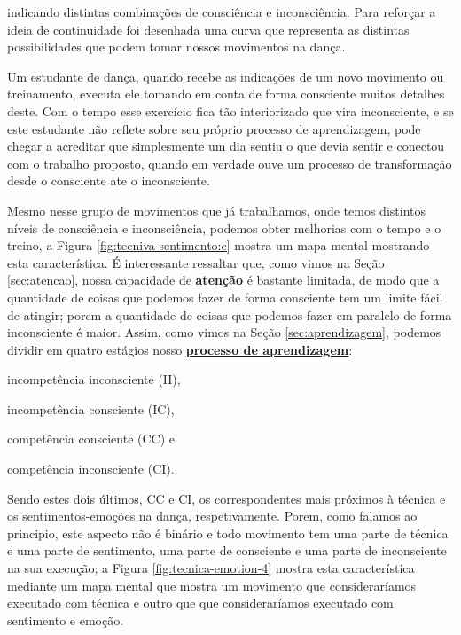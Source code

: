 indicando distintas combinações de consciência e inconsciência.
Para reforçar a ideia de continuidade foi desenhada uma curva que representa as 
distintas possibilidades que podem tomar nossos movimentos na dança.
\begin{example} Um estudante de dança, quando recebe
as indicações de um novo movimento ou treinamento, 
executa ele tomando em conta de forma consciente muitos detalhes deste.
Com o tempo esse exercício fica tão interiorizado que vira inconsciente,
e se este estudante não reflete sobre seu próprio processo de aprendizagem, pode chegar a acreditar 
que simplesmente um dia sentiu o que devia sentir e conectou com o trabalho proposto,
quando em verdade ouve um processo de transformação desde o consciente ate o inconsciente.
\end{example}
Mesmo nesse grupo de movimentos que já trabalhamos, 
onde temos distintos níveis de consciência  e inconsciência,
podemos obter melhorias com o tempo e o treino, a Figura \ref{fig:tecniva-sentimento:c} 
mostra um mapa mental mostrando esta característica.
É interessante ressaltar que, como vimos na Seção \ref{sec:atencao}, 
nossa capacidade de \hyperref[sec:atencao]{\textbf{atenção}} 
é bastante limitada, de modo que a quantidade de coisas que podemos fazer de forma consciente 
tem um limite fácil de atingir; porem a quantidade de coisas que podemos fazer em paralelo de 
forma inconsciente é maior.
Assim, como vimos na Seção \ref{sec:aprendizagem}, 
podemos dividir em quatro estágios nosso \hyperref[sec:aprendizagem]{\textbf{processo de aprendizagem}}:
\begin{inparaitem}
\item incompetência inconsciente (II), \item incompetência consciente (IC), 
\item competência consciente (CC) e \item competência inconsciente (CI).
\end{inparaitem}
Sendo estes dois últimos, CC e CI, 
os correspondentes mais próximos à técnica e os sentimentos-emoções na dança, respetivamente. 
Porem, como falamos ao principio, este aspecto não é binário e todo movimento 
tem uma parte de técnica e uma parte de sentimento, 
uma parte de consciente e uma parte de inconsciente na sua execução;
a Figura \ref{fig:tecnica-emotion-4} mostra esta característica mediante um mapa mental
que mostra um movimento que consideraríamos executado com técnica e 
outro que que consideraríamos executado com sentimento e emoção.
